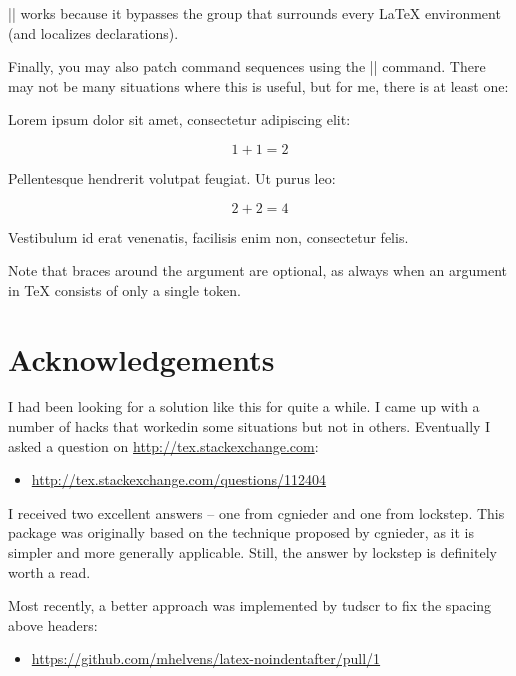 \documentclass[a4paper]{noindentafter-packagedoc}
\begin{document}
|\NoIndentAfterEnv| works because it bypasses the group
that surrounds every \LaTeX{} environment (and localizes
declarations). 




Finally, you may also patch command sequences using the
|\NoIndentAfterCmd| command. There may not be many situations
where this is useful, but for me, there is at least one:

\begin{latex-example-show}
  Lorem ipsum dolor sit amet, consectetur adipiscing elit:
  
  \[ 1 + 1 = 2 \]
  
  Pellentesque hendrerit volutpat feugiat. Ut purus leo:
  
  \NoIndentAfterCmd \]
  
  \[ 2 + 2 = 4 \]
  
  Vestibulum id erat venenatis, facilisis enim non,
  consectetur felis.
\end{latex-example-show}

Note that braces around the  argument are
optional, as always when an argument in \TeX{} consists
of only a single token.



\section{Acknowledgements}                                                     %

I had been looking for a solution like this for quite a while. I came up
with a number of hacks that workedin some situations but not in others.
Eventually I asked a question on \url{http://tex.stackexchange.com}:
\begin{itemize}
  \item \url{http://tex.stackexchange.com/questions/112404}
\end{itemize}

I received two excellent answers -- one from cgnieder and one from lockstep.
This package was originally based on the technique proposed by cgnieder, as
it is simpler and more generally applicable. Still, the answer by lockstep
is definitely worth a read.

Most recently, a better approach was implemented by tudscr to fix the spacing
above headers:
\begin{itemize}
  \item \url{https://github.com/mhelvens/latex-noindentafter/pull/1}
\end{itemize}

\end{document}
